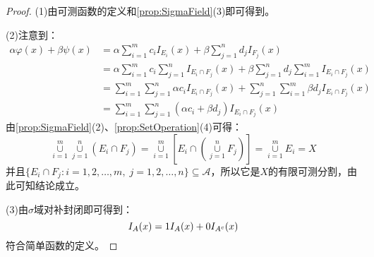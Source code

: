 \begin{proof}
	(1)由可测函数的定义和\cref{prop:SigmaField}(3)即可得到。\par
	(2)注意到：
	\begin{align*}
		\alpha\varphi(x)+\beta\psi(x)
		&=\alpha\sum_{i=1}^{m}c_iI_{E_i}(x)+\beta\sum_{j=1}^{n}d_jI_{F_j}(x) \\
		&=\alpha\sum_{i=1}^{m}c_i\sum_{j=1}^{n}I_{E_i\cap F_j}(x)+\beta\sum_{j=1}^{n}d_j\sum_{i=1}^{m}I_{E_i\cap F_j}(x) \\
		&=\sum_{i=1}^{m}\sum_{j=1}^{n}\alpha c_iI_{E_i\cap F_j}(x)+\sum_{j=1}^{n}\sum_{i=1}^{m}\beta d_jI_{E_i\cap F_j}(x) \\
		&=\sum_{i=1}^{m}\sum_{j=1}^{n}(\alpha c_i+\beta d_j)I_{E_i\cap F_j}(x)
	\end{align*}
	由\cref{prop:SigmaField}(2)、\cref{prop:SetOperation}(4)可得：
	\begin{equation*}
		\underset{i=1}{\overset{m}{\cup}}\underset{j=1}{\overset{n}{\cup}}(E_i\cap F_j)=\underset{i=1}{\overset{m}{\cup}}\left[E_i\cap\left(\underset{j=1}{\overset{n}{\cup}}F_j\right)\right]=\underset{i=1}{\overset{m}{\cup}}E_i=X
	\end{equation*}
	并且$\{E_i\cap F_j:i=1,2,\dots,m,\;j=1,2,\dots,n\}\subseteq\mathscr{A}$，所以它是$X$的有限可测分割，由此可知结论成立。\par
	(3)由$\sigma$域对补封闭即可得到：
	\begin{equation*}
		I_A(x)=1I_A(x)+0I_{A^c}(x)\qedhere
	\end{equation*}
	符合简单函数的定义。
\end{proof}
